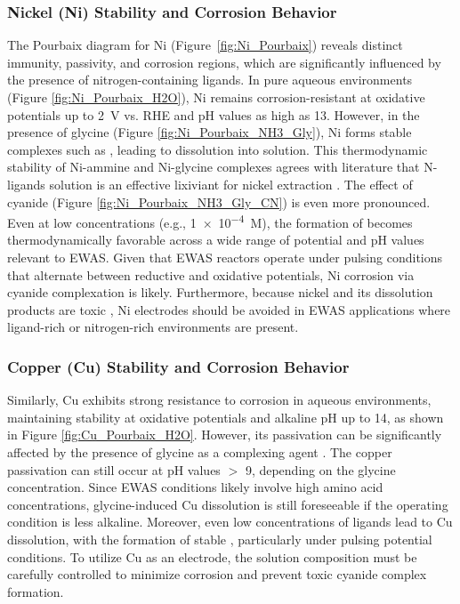 \documentclass[journal=jacsat,manuscript=article]{achemso}
\begin{document}

\subsubsection{Nickel (Ni) Stability and Corrosion Behavior}

The Pourbaix diagram for Ni (Figure~\ref{fig:Ni_Pourbaix}) reveals distinct immunity, passivity, and corrosion regions, which are significantly influenced by the presence of nitrogen-containing ligands. In pure aqueous environments (Figure \ref{fig:Ni_Pourbaix_H2O}), Ni remains corrosion-resistant at oxidative potentials up to 2~V vs. RHE and pH values as high as 13. However, in the presence of glycine (Figure \ref{fig:Ni_Pourbaix_NH3_Gly}), Ni forms stable complexes such as \ce{[Ni(Gly)_3]^{-}}, leading to dissolution into solution. This thermodynamic stability of Ni-ammine and Ni-glycine complexes agrees with literature that N-ligands solution is an effective lixiviant for nickel extraction \cite{Meng1996PrinciplesReview, Yao2021SelectivePhosphide, Ma2021ALeaching}. The effect of cyanide (Figure \ref{fig:Ni_Pourbaix_NH3_Gly_CN}) is even more pronounced. Even at low concentrations (e.g., \num{1e-4}~M), the formation of  becomes thermodynamically favorable across a wide range of potential and pH values relevant to EWAS. Given that EWAS reactors operate under pulsing conditions that alternate between reductive and oxidative potentials, Ni corrosion via cyanide complexation is likely. Furthermore, because nickel and its dissolution products are toxic \cite{Bhattacharya2009CyanideTreatment}, Ni electrodes should be avoided in EWAS applications where ligand-rich or nitrogen-rich environments are present.


\subsubsection{Copper (Cu) Stability and Corrosion Behavior}
Similarly, Cu exhibits strong resistance to corrosion in aqueous environments, maintaining stability at oxidative potentials and alkaline pH up to 14, as shown in Figure \ref{fig:Cu_Pourbaix_H2O}. However, its passivation can be significantly affected by the presence of glycine as a complexing agent \cite{Wang2022ThermodynamicDiagrams,Tripathi2009FundamentalConstituents,Skrypnikova2008PeculiaritiesAdditives,OConnor2018ElectrochemicalSolutions}. The copper passivation can still occur at pH values $>$ 9, depending on the glycine concentration. Since EWAS conditions likely involve high amino acid concentrations, glycine-induced Cu dissolution is still foreseeable if the operating condition is less alkaline. Moreover, even low concentrations of  ligands lead to Cu dissolution, with the formation of stable , particularly under pulsing potential conditions. To utilize Cu as an electrode, the solution composition must be carefully controlled to minimize corrosion and prevent toxic cyanide complex formation.
\end{document}
